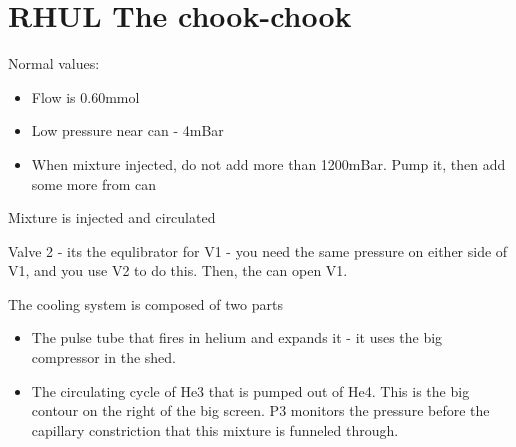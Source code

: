 \section{RHUL The chook-chook}
Normal values:
\begin{itemize}
  \item Flow is 0.60mmol
  \item Low pressure near can - 4mBar
  \item When mixture injected, do not add more than 1200mBar. Pump it, then add
        some more from can
\end{itemize}

Mixture is injected and circulated

\begin{framed}\noindent
  Valve 2 - its the equlibrator for V1 - you need the same pressure on either
  side of V1, and you use V2 to do this. Then, the can open V1.
\end{framed}
\begin{framed}\noindent
  The cooling system is composed of two parts
  \begin{itemize}
    \item The pulse tube that fires in helium and expands it - it uses the big
          compressor in the shed.
    \item The circulating cycle of He3 that is pumped out of He4. This is the
          big contour on the right of the big screen. P3 monitors the pressure
          before the capillary constriction that this mixture is funneled
          through.
  \end{itemize}
\end{framed}

